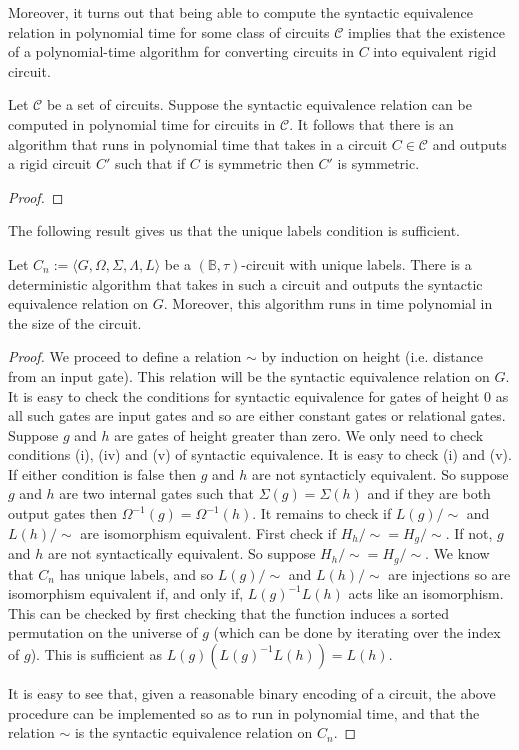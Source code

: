 \documentclass[../paper.tex]{subfiles}
\begin{document}
Moreover, it turns out that being able to compute the syntactic equivalence
relation in polynomial time for some class of circuits $\mathcal{C}$ implies
that the existence of a polynomial-time algorithm for converting circuits in $C$
into equivalent rigid circuit.

\begin{prop}
  Let $\mathcal{C}$ be a set of circuits. Suppose the syntactic equivalence
  relation can be computed in polynomial time for circuits in $\mathcal{C}$. It
  follows that there is an algorithm that runs in polynomial time that takes in
  a circuit $C \in \mathcal{C}$ and outputs a rigid circuit $C'$ such that if
  $C$ is symmetric then $C'$ is symmetric.
  \label{prop:syntactic-equivilence-rigid}
\end{prop}
\begin{proof}
\end{proof}

The following result gives us that the unique labels condition is sufficient.

\begin{prop}
  Let $C_n := \langle G, \Omega, \Sigma, \Lambda, L \rangle$ be a $(\mathbb{B},
  \tau)$-circuit with unique labels. There is a deterministic algorithm that
  takes in such a circuit and outputs the syntactic equivalence relation on $G$.
  Moreover, this algorithm runs in time polynomial in the size of the circuit.
  \label{prop:unique-labels-syntactic-equiv}
\end{prop}
\begin{proof}
  We proceed to define a relation $\sim$ by induction on height (i.e. distance
  from an input gate). This relation will be the syntactic equivalence relation
  on $G$. It is easy to check the conditions for syntactic equivalence for gates
  of height 0 as all such gates are input gates and so are either constant gates
  or relational gates. Suppose $g$ and $h$ are gates of height greater than
  zero. We only need to check conditions (i), (iv) and (v) of syntactic
  equivalence. It is easy to check (i) and (v). If either condition is false
  then $g$ and $h$ are not syntacticly equivalent. So suppose $g$ and $h$ are
  two internal gates such that $\Sigma (g) = \Sigma(h)$ and if they are both
  output gates then $\Omega^{-1}(g) = \Omega^{-1}(h)$. It remains to check if
  $L(g)/{\sim}$ and $L(h)/{\sim}$ are isomorphism equivalent. First check if
  $H_h /{\sim} = H_g /{\sim}$. If not, $g$ and $h$ are not syntactically
  equivalent. So suppose $H_h /{\sim} = H_g /{\sim}$. We know that $C_n$ has
  unique labels, and so $L(g)/{\sim}$ and $L(h)/{\sim}$ are injections so are
  isomorphism equivalent if, and only if, $L(g)^{-1}L(h)$ acts like an
  isomorphism. This can be checked by first checking that the function induces a
  sorted permutation on the universe of $g$ (which can be done by iterating over
  the index of $g$). This is sufficient as $L(g)(L(g)^{-1}L(h)) = L(h)$.

  It is easy to see that, given a reasonable binary encoding of a circuit, the
  above procedure can be implemented so as to run in polynomial time, and that
  the relation $\sim$ is the syntactic equivalence relation on $C_n$.
\end{proof}
\end{document}
